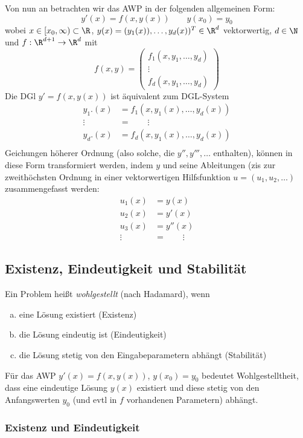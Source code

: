 \documentclass[
]{mycourse}
\begin{document}
Von nun an betrachten wir das AWP in der folgenden allgemeinen Form:
\[
	y'(x) = f(x,y(x))
	\qquad y(x_0) = y_0
\]
wobei $x \in [x_0,\infty) \subset \R$, $y(x) = (y_1(x)),\dotsc,y_d(x))^T \in \R^d$ vektorwertig, $d \in \N$ und $f : \R^{d+1} \to \R^d$ mit
\[
	f(x,y) = \begin{pmatrix}
		f_1(x,y_1,\dotsc, y_d) \\
		\vdots \\
		f_d(x,y_1,\dotsc, y_d)
	\end{pmatrix}
\]
Die DGl $y' = f(x,y(x))$ ist äquivalent zum DGL-System
\begin{align*}
	y_1.(x) &= f_1(x,y_1(x),\dotsc,y_d(x)) \\
	\vdots \quad &= \qquad \vdots \\
	y_d.(x) &= f_d(x,y_1(x),\dotsc,y_d(x)) \\
\end{align*}
Geichungen höherer Ordnung (also solche, die $y'', y''', \dotsc$ enthalten), können in diese Form transformiert werden, indem $y$ und seine Ableitungen (zis zur zweithöchsten Ordnung in einer vektorwertigen Hilfsfunktion $u=(u_1,u_2,\dotsc)$ zusammengefasst werden:
\begin{align*}
	u_1(x) &= y(x) \\
	u_2(x) &= y'(x) \\
	u_3(x) &= y''(x) \\
	\vdots \quad&= \qquad \vdots
\end{align*}



\subsection{Existenz, Eindeutigkeit und Stabilität}


Ein Problem heißt \emph{wohlgestellt} (nach Hadamard), wenn
\begin{enumerate}[a)]
	\item
		eine Lösung existiert (Existenz)
	\item
		die Lösung eindeutig ist (Eindeutigkeit)
	\item
		die Lösung stetig von den Eingabeparametern abhängt (Stabilität)
\end{enumerate}
Für das AWP $y'(x) = f(x,y(x))$, $y(x_0) = y_0$ bedeutet Wohlgestelltheit, dass eine eindeutige Lösung $y(x)$ existiert und diese stetig von den Anfangswerten $y_0$ (und evtl in $f$ vorhandenen Parametern) abhängt.


\subsubsection{Existenz und Eindeutigkeit}
\end{document}
